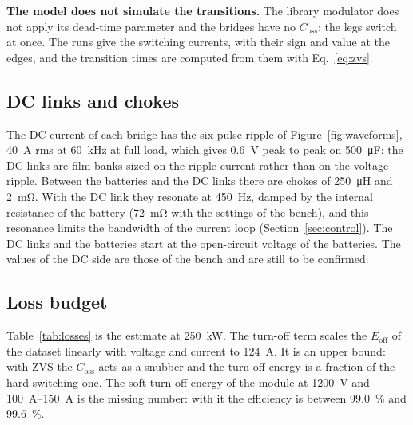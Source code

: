\documentclass[12pt,a4paper]{scrartcl}
\newcommand{\ped}[1]{_{\mathrm{#1}}}
\begin{document}
\begin{onehalfspace}
\noindent\textbf{The model does not simulate the transitions.} The library modulator does not apply its dead-time parameter and the bridges have no $C\ped{oss}$: the legs switch at once. The runs give the switching currents, with their sign and value at the edges, and the transition times are computed from them with Eq.~\eqref{eq:zvs}.

\subsection{DC links and chokes}
\label{sec:dclinks}

The DC current of each bridge has the six-pulse ripple of Figure~\ref{fig:waveforms}, \SI{40}{\ampere} rms at \SI{60}{\kilo\hertz} at full load, which gives \SI{0.6}{\volt} peak to peak on \SI{500}{\micro\farad}: the DC links are film banks sized on the ripple current rather than on the voltage ripple. Between the batteries and the DC links there are chokes of \SI{250}{\micro\henry} and \SI{2}{\milli\ohm}. With the DC link they resonate at \SI{450}{\hertz}, damped by the internal resistance of the battery (\SI{72}{\milli\ohm} with the settings of the bench), and this resonance limits the bandwidth of the current loop (Section~\ref{sec:control}). The DC links and the batteries start at the open-circuit voltage of the batteries. The values of the DC side are those of the bench and are still to be confirmed.

\subsection{Loss budget}
\label{sec:losses}

Table~\ref{tab:losses} is the estimate at \SI{250}{\kilo\watt}. The turn-off term scales the $E\ped{off}$ of the dataset linearly with voltage and current to \SI{124}{\ampere}. It is an upper bound: with ZVS the $C\ped{oss}$ acts as a snubber and the turn-off energy is a fraction of the hard-switching one. The soft turn-off energy of the module at \SI{1200}{\volt} and \SIrange{100}{150}{\ampere} is the missing number: with it the efficiency is between \SI{99.0}{\percent} and \SI{99.6}{\percent}.


\end{onehalfspace}
\end{document}
